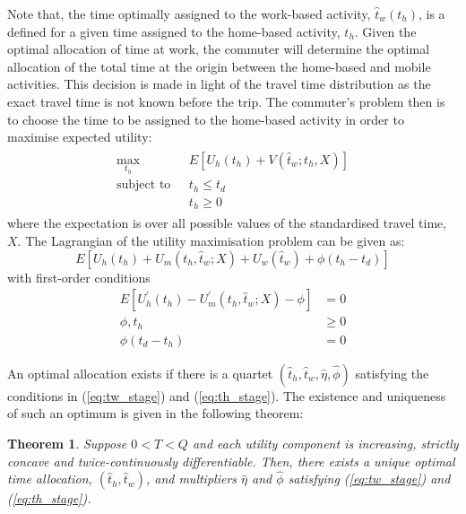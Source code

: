 \documentclass[12pt,a4paper,british]{article}
\newtheorem{theorem}{Theorem}[section]
\begin{document}
Note that, the time optimally assigned to the work-based activity, $\hat{t}_w(t_h)$, is a defined for a given time assigned to the home-based activity, $t_h$. Given the optimal allocation of time at work, the commuter will determine the optimal allocation of the total time at the origin between the home-based and mobile activities. This decision is made in light of the travel time distribution as the exact travel time is not known before the trip. The commuter's problem then is to choose the time to be assigned to the home-based activity in order to maximise expected utility:
\begin{align}
\begin{split}
\max_{t_{h}} \quad & E\left[U_{h}\left(t_{h}\right)+V\left(\hat{t}_{w};t_{h}, X\right)\right]\\
\mbox{subject to } \,\, & t_{h} \leq t_{d} \\
& t_h \geq 0
\end{split}
\label{eq:firstStageProblem}
\end{align}
where the expectation is over all possible values of the standardised travel time, $X$. The Lagrangian of the utility maximisation problem can be given as:
\begin{equation*}
E\left[U_{h}\left(t_{h}\right) + U_{m}\left(t_{h}, \hat{t}_{w}; X \right) + U_{w}\left(\hat{t}_{w}\right) + \phi\left(t_{h} - t_{d} \right)\right]
\end{equation*}
with first-order conditions
\begin{subequations}\label{eq:th_stage}
\begin{align}
E\left[U_{h}^{\prime}\left(t_{h}\right) - U_{m}^{\prime}\left(t_{h} ,\hat{t}_{w}; X\right) - \phi\right] & =0
\label{eq:stage1_wrt_th}\\
\phi,t_{h} & \geq 0
\label{eq:stage1_lambda}\\
\phi\left(t_{d}-t_{h}\right) & =0
\label{eq:stage1_lambdai_const}
\end{align}
\end{subequations}

An optimal allocation exists if there is a quartet $\left(\hat{t}_{h},\hat{t}_{w},\hat{\eta},\hat{\phi}\right)$ satisfying the conditions in (\ref{eq:tw_stage}) and (\ref{eq:th_stage}). The existence and uniqueness of such an optimum is given in the following theorem:
\begin{theorem}
\label{thm:existence_stochastic}
Suppose $0<T<Q$ and each utility component is increasing, strictly concave and twice-continuously differentiable. Then, there exists a unique optimal time allocation, $\left(\hat{t}_{h},\hat{t}_{w}\right)$, and multipliers $\hat{\eta}$ and $\hat{\phi}$ satisfying (\ref{eq:tw_stage}) and (\ref{eq:th_stage}).
\end{theorem}
\end{document}
